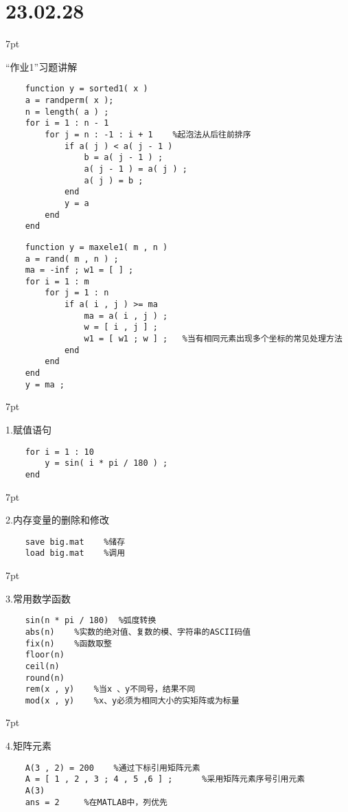 \documentclass{article} %
\newenvironment{eg}{%
\def\FrameCommand{%
\hspace{1pt}%
{\color{Gray}\vrule width 2pt}%
{\color{egshade}\vrule width 4pt}%
\colorbox{egshade}%
}%
\MakeFramed{\advance\hsize-\width\FrameRestore}%
\noindent\hspace{-4.55pt}%
\begin{adjustwidth}{}{7pt}%
\vspace{2pt}\vspace{2pt}%
\normalfont %
}
{%
\vspace{2pt}\end{adjustwidth}\endMakeFramed%
}
\newenvironment{wa}{%
\def\FrameCommand{%
\hspace{1pt}%
{\color{LightCoral}\vrule width 2pt}%
{\color{washade}\vrule width 4pt}%
\colorbox{washade}%
}%
\MakeFramed{\advance\hsize-\width\FrameRestore}%
\noindent\hspace{-4.55pt}%
\begin{adjustwidth}{}{7pt}%
\vspace{2pt}\vspace{2pt}%
\normalfont %
}
{%
\vspace{2pt}\end{adjustwidth}\endMakeFramed%
}
\begin{document}
\newpage
\noindent \Large \section*{23.02.28} \par \normalsize
\begin{wa}
    “作业1”习题讲解
\end{wa}
\begin{lstlisting}
    function y = sorted1( x )
    a = randperm( x );
    n = length( a ) ;
    for i = 1 : n - 1
        for j = n : -1 : i + 1    %起泡法从后往前排序
            if a( j ) < a( j - 1 )
                b = a( j - 1 ) ;
                a( j - 1 ) = a( j ) ;
                a( j ) = b ;
            end
            y = a
        end
    end
\end{lstlisting}
\begin{lstlisting}
    function y = maxele1( m , n )
    a = rand( m , n ) ;
    ma = -inf ; w1 = [ ] ;
    for i = 1 : m
        for j = 1 : n
            if a( i , j ) >= ma
                ma = a( i , j ) ;
                w = [ i , j ] ;
                w1 = [ w1 ; w ] ;   %当有相同元素出现多个坐标的常见处理方法
            end
        end
    end
    y = ma ;
\end{lstlisting}

\begin{eg}
    1.赋值语句
\end{eg}
\begin{lstlisting}
    for i = 1 : 10
        y = sin( i * pi / 180 ) ;
    end
\end{lstlisting}

\begin{eg}
    2.内存变量的删除和修改
\end{eg}
\begin{lstlisting}
    save big.mat    %储存
    load big.mat    %调用
\end{lstlisting}

\begin{eg}
    3.常用数学函数
\end{eg}
\begin{lstlisting}
    sin(n * pi / 180)  %弧度转换
    abs(n)    %实数的绝对值、复数的模、字符串的ASCII码值
    fix(n)    %函数取整
    floor(n)
    ceil(n)
    round(n)
    rem(x , y)    %当x 、y不同号，结果不同
    mod(x , y)    %x、y必须为相同大小的实矩阵或为标量
\end{lstlisting}

\begin{eg}
    4.矩阵元素
\end{eg}
\begin{lstlisting}
    A(3 , 2) = 200    %通过下标引用矩阵元素
    A = [ 1 , 2 , 3 ; 4 , 5 ,6 ] ;      %采用矩阵元素序号引用元素
    A(3)
    ans = 2     %在MATLAB中，列优先
\end{lstlisting}
\end{document}

